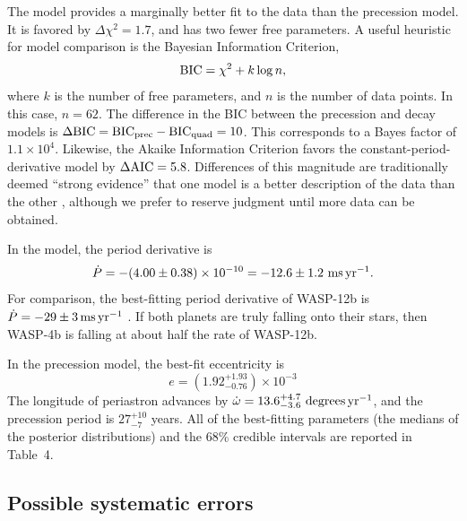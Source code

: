 \documentclass[12pt,twocolumn,tighten]{aastex62}
\begin{document}
The  model provides a
marginally better fit to the data than the precession model.  It is
favored by $\Delta \chi^2 = 1.7$, and has two fewer free parameters.
A useful heuristic for model comparison is the Bayesian Information
Criterion,
\begin{equation}
  {\rm BIC} = \chi^2 + k\log n,
\end{equation}
where $k$ is the number of free parameters, and $n$ is the number of
data points. In this case, $n=62$.  The difference in the BIC between
the precession and decay models is $\Delta {\rm BIC} = {\rm BIC}_{\rm
prec} - {\rm BIC}_{\rm quad} = 10$. This corresponds to a Bayes factor of
$1.1\times 10^{4}$.  Likewise, the Akaike Information Criterion favors
the constant-period-derivative model by $\Delta {\rm AIC} = 5.8$.
Differences of this magnitude are traditionally deemed ``strong
evidence'' that one model is a better description of the data than the
other \citep{kass_bayes_1995}, although we prefer to reserve judgment
until more data can be obtained.

In the  model, the period
derivative is
\begin{equation}
\dot{P}
  = - (4.00 \pm 0.38)\times 10^{-10}
  = - 12.6 \pm 1.2~{\rm ms}\,{\rm yr}^{-1}.
  \label{eq:dP_dt_obs}
\end{equation}
For comparison, the best-fitting period derivative of WASP-12b is
$\dot{P} = -29 \pm 3\,{\rm ms}\,{\rm yr}^{-1}$
\citep{maciejewski_departure_2016,patra_2017}.  If both planets are
truly falling onto their stars, then WASP-4b is falling at about half
the rate of WASP-12b.

In the precession model, the best-fit eccentricity is
\begin{equation}
  e = (1.92^{+ 1.93}_{- 0.76})\times10^{-3}
  \label{eq:e_obs}
\end{equation}
The longitude of periastron advances by $\dot{\omega} =
13.6^{+4.7}_{-3.6}\ {\rm degrees}\,{\rm yr}^{-1}$, and the precession
period is $27^{+10}_{-7}$ years.  All of the best-fitting parameters
(the medians of the posterior distributions) and the 68\% credible
intervals are reported in Table~4.


\subsection{Possible systematic errors}
\end{document}
